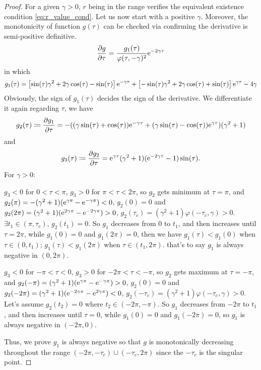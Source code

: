 \documentclass{article}
\newtheorem{proof}{Proof}[theorem]
\begin{document}
\begin{proof}
For a given $\gamma>0$,  $r$ being in the range verifies the equivalent  existence condition 
\cref{eq:r_value_cond}. 
Let us now start with a positive $\gamma$.
Moreover, the monotonicity of function $g(\tau)$ can be checked via confirming the derivative is semi-positive definitive.
% 
\begin{equation}
	\frac{\partial  g}{\partial  \tau} = \frac{g_1(\tau)}{\varphi(\tau,-\gamma)^2} {\rm e}^{-2\gamma \tau}
\end{equation}
in which 
\[
g_1(\tau) = \left[
\sin(\tau) \gamma^2 + 2\gamma \cos(\tau) - \sin(\tau)\right]
{\rm e}^{ - \gamma \tau} 
+ 
\left[
-\sin(\tau) \gamma^2 + 2\gamma\cos(\tau) + \sin(\tau)
\right] {\rm e}^{\gamma \tau} - 4\gamma
\]
Obviously, the sign of $g_1(\tau)$ decides the sign of the derivative. We differentiate it again regarding $\tau$, we have
\[
g_2(\tau) \coloneq
\frac{\partial g_1}{\partial \tau} = -((\gamma \sin(\tau) + \cos(\tau)) {\rm e}^{- \gamma \tau} + (\gamma \sin(\tau) - \cos(\tau)) {\rm e}^{ \gamma \tau}) (\gamma^2 + 1)
\]
and 
\[
g_3(\tau) \coloneq
\frac{\partial g_2}{\partial \tau} ={\rm e}^{ \gamma \tau}(\gamma^2 + 1)({\rm e}^{- 2 \gamma \tau} - 1) \sin(\tau).
\]
For $\gamma > 0$:

 $g_3<0$ for $0<\tau < \pi$,  $g_3>0$ for $\pi<\tau < 2\pi$, so $g_2$ gets minimum at $\tau =\pi$, and $g_2(\pi) = -(\gamma^2+1)({\rm e}^{\gamma \pi} - {\rm e}^{-\gamma \pi})<0$, $g_2(0) =0$ and $g_2(2\pi) = (\gamma^2+1)({\rm e}^{2\gamma \pi} - {\rm e}^{-2\gamma \pi})>0$, $g_2(\tau_c) = (\gamma^2 + 1)\varphi(-\tau_c, \gamma) >0$. $\exists t_1 \in (\pi, \tau_c)$, $g_2(t_1) = 0$.
So $g_1$ decreases from 0 to $t_1$, and then increases until $\tau = 2 \pi$, while $g_1(0) =0$ and $g_1(2\pi)=0$, then we have $g_1(\tau)< g_1(0)$ when  $\tau \in (0,t_1)$; $g_1(\tau)< g_1(2\pi)$ when $\tau \in (t_1, 2\pi)$. that's to say $g_1$ is always negative in $(0,2\pi)$.

 $g_3<0$ for $-\pi<\tau < 0$,  $g_3>0$ for $-2\pi<\tau < -\pi$, so $g_2$ gets maximum at $\tau =-\pi$, and $g_2(-\pi) = (\gamma^2+1)({\rm e}^{\gamma \pi} - {\rm e}^{-\gamma \pi})>0$, $g_2(0) =0$ and $g_2(-2\pi) = (\gamma^2+1)({\rm e}^{-2\gamma \pi} - {\rm e}^{2\gamma \pi})<0$, $g_2(-\tau_c) = (\gamma^2 + 1)\varphi(-\tau_c, \gamma) >0$.
Let's assume $g_2(t_2) =0$ where $t_2 \in (-2\pi, -\pi)$.
So $g_1$ decreases from $-2\pi$ to $t_1$, and then increases until $\tau =  0$, while $g_1(0) =0$ and $g_1(-2\pi)=0$, so $g_1$ is always negative in $(-2\pi,0)$.

Thus, we prove $g_1$ is always negative so that $g$ is monotonically decreasing throughout the range $(-2\pi, -\tau_c ) \cup (-\tau_c, 2\pi)$ since the $-\tau_c$ is the singular point. 

\end{proof}
\end{document}
